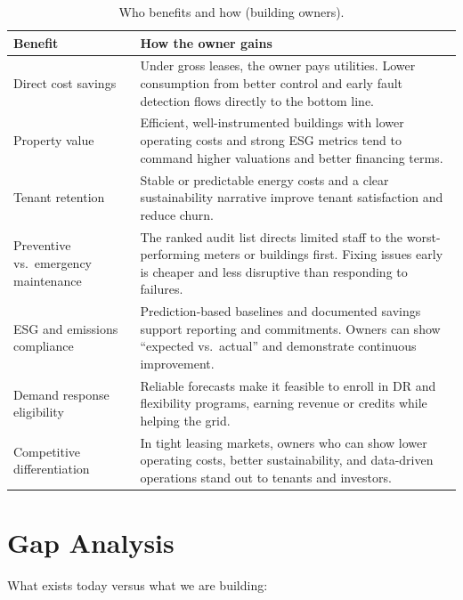 \documentclass[11pt,a4paper]{article}
\begin{document}
\begin{table}[htbp]
\centering
\small
\begin{tabular}{@{}p{2.2cm}p{9.5cm}@{}}
\toprule
\textbf{Benefit} & \textbf{How the owner gains} \\
\midrule
Direct cost savings & Under gross leases, the owner pays utilities. Lower consumption from better control and early fault detection flows directly to the bottom line. \\
Property value & Efficient, well-instrumented buildings with lower operating costs and strong ESG metrics tend to command higher valuations and better financing terms. \\
Tenant retention & Stable or predictable energy costs and a clear sustainability narrative improve tenant satisfaction and reduce churn. \\
Preventive vs.\ emergency maintenance & The ranked audit list directs limited staff to the worst-performing meters or buildings first. Fixing issues early is cheaper and less disruptive than responding to failures. \\
ESG and emissions compliance & Prediction-based baselines and documented savings support reporting and commitments. Owners can show ``expected vs.\ actual'' and demonstrate continuous improvement. \\
Demand response eligibility & Reliable forecasts make it feasible to enroll in DR and flexibility programs, earning revenue or credits while helping the grid. \\
Competitive differentiation & In tight leasing markets, owners who can show lower operating costs, better sustainability, and data-driven operations stand out to tenants and investors. \\
\bottomrule
\end{tabular}
\caption{Who benefits and how (building owners).}
\end{table}

\section{Gap Analysis}

What exists today versus what we are building:
\end{document}
